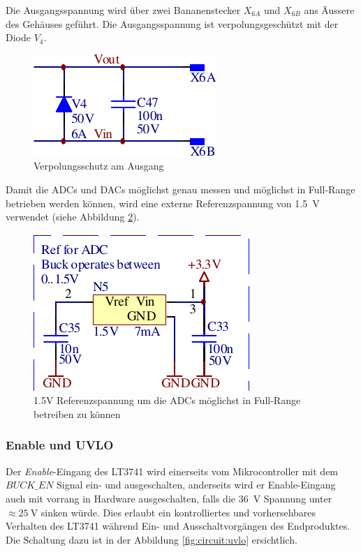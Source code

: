 Die Ausgangsspannung wird \"uber zwei  Bananenstecker  $X_{6A}$ und $X_{6B}$ ans
\"Aussere    des    Geh\"auses     gef\"uhrt.     Die    Ausgangsspannung    ist
verpolungsgesch\"utzt mit der Diode $V_4$.

\begin{figure}[th!]
    \center
    \includegraphics[width=.35\textwidth]{images/circuit/output-connectors.pdf}
    \caption{Verpolungsschutz am Ausgang}
    \label{fig:circuit:output}
\end{figure}

Damit die ADCs und DACs  m\"oglichst  genau messen und m\"oglichst in Full-Range
betrieben    werden   k\"onnen,   wird   eine   externe   Referenzspannung   von
\SI{1.5}{\volt}    verwendet     (siehe    Abbildung    \ref{fig:circuit:vref}).

\begin{figure}[th!]
    \center
    \includegraphics[width=.4\textwidth]{images/circuit/vref.pdf}
    \caption{1.5V Referenzspannung um die ADCs m\"oglichst in Full-Range betreiben zu k\"onnen}
    \label{fig:circuit:vref}
\end{figure}

\subsubsection*{Enable und UVLO}

Der \emph{Enable}-Eingang des LT3741 wird einerseits vom Mikrocontroller mit dem
$BUCK\_EN$ Signal ein- und ausgeschalten, anderseits wird er Enable-Eingang auch
mit vorrang in  Hardware  ausgeschalten, falls die \SI{36}{\volt} Spannung unter
$\approx  \SI{25}{\volt}$  sinken  w\"urde. Dies erlaubt ein kontrolliertes  und
vorhersehbares Verhalten des LT3741 w\"ahrend Ein-  und Ausschaltvorg\"angen des
Endproduktes.  Die  Schaltung  dazu  ist in der Abbildung \ref{fig:circuit:uvlo}
ersichtlich.

